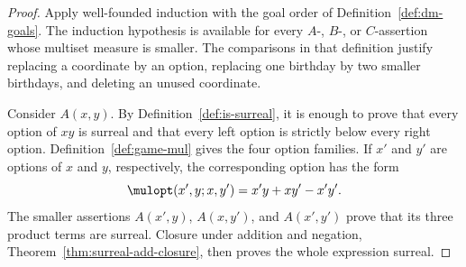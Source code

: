 \begin{proof}
  \leanok
  Apply well-founded induction with the goal order of
  Definition~\ref{def:dm-goals}.  The induction hypothesis is available for
  every \(A\)-, \(B\)-, or \(C\)-assertion whose multiset measure is smaller.
  The comparisons in that definition justify replacing a coordinate by an
  option, replacing one birthday by two smaller birthdays, and deleting an
  unused coordinate.

  Consider \(A(x,y)\).  By Definition~\ref{def:is-surreal}, it is enough to
  prove that every option of \(xy\) is surreal and that every left option is
  strictly below every right option.  Definition~\ref{def:game-mul} gives the
  four option families.  If \(x'\) and \(y'\) are options of \(x\) and \(y\),
  respectively, the corresponding option has the form
  \[
    \mulopt(x',y;x,y')=x'y+xy'-x'y'.
  \]
  The smaller assertions \(A(x',y)\), \(A(x,y')\), and \(A(x',y')\) prove
  that its three product terms are surreal.  Closure under addition and
  negation, Theorem~\ref{thm:surreal-add-closure}, then proves the whole
  expression surreal.


\end{proof}
